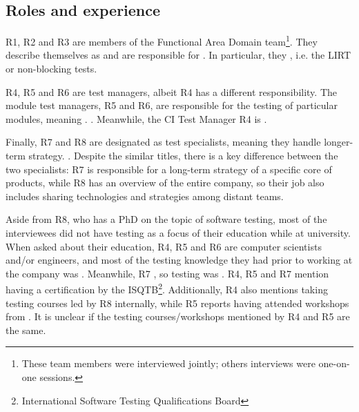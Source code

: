 \subsection{Roles and experience}

R1, R2 and R3 are members of the Functional Area Domain team\footnote{These team members were interviewed jointly; others interviews were one-on-one sessions.}.
They describe themselves as  and are responsible for .
In particular, they , i.e. the LIRT or non-blocking tests.

R4, R5 and R6 are test managers, albeit R4 has a different responsibility.
The module test managers, R5 and R6, are responsible for the testing of particular modules, meaning .
.
Meanwhile, the CI Test Manager R4 is .

Finally, R7 and R8 are designated as test specialists, meaning they handle longer-term strategy.
.
Despite the similar titles, there is a key difference between the two specialists: R7 is responsible for a long-term strategy of a specific core of products, while R8 has an overview of the entire company, so their job also includes sharing technologies and strategies among distant teams.

Aside from R8, who has a PhD on the topic of software testing, most of the interviewees did not have testing as a focus of their education while at university.
When asked about their education, R4, R5 and R6 are computer scientists and/or engineers, and most of the testing knowledge they had prior to working at the company was .
Meanwhile, R7 , so testing was .
R4, R5 and R7 mention having a certification by the ISQTB\footnote{International Software Testing Qualifications Board}.
Additionally, R4 also mentions taking testing courses led by R8 internally, while R5 reports having attended workshops from .
It is unclear if the testing courses/workshops mentioned by R4 and R5 are the same.

